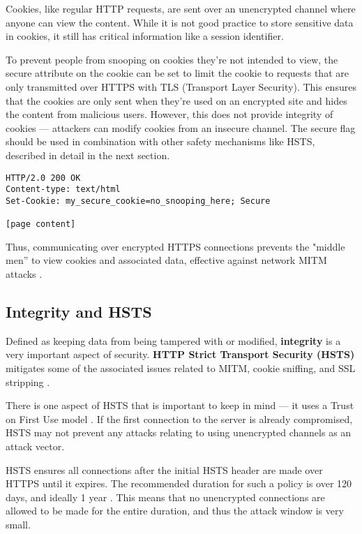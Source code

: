 \documentclass[conference,12pt]{IEEEtran}
\begin{document}
Cookies, like regular HTTP requests, are sent over an unencrypted channel where
anyone can view the content.  While it is not good practice to store sensitive
data in cookies, it still has critical information like a session identifier.

To prevent people from snooping on cookies they’re not intended to view, the
secure attribute on the cookie can be set to limit the cookie to requests that
are only transmitted over HTTPS with TLS (Transport Layer Security).  This
ensures that the cookies are only sent when they’re used on an encrypted site
and hides the content from malicious users.  However, this does not provide
integrity of cookies — attackers can modify cookies from an insecure channel.
The secure flag should be used in combination with other safety mechanisms like
HSTS, described in detail in the next section.

\begin{lstlisting}[caption={An example of server response header to set a secure cookie}]
HTTP/2.0 200 OK
Content-type: text/html
Set-Cookie: my_secure_cookie=no_snooping_here; Secure

[page content]
\end{lstlisting}

Thus, communicating over encrypted HTTPS connections prevents the "middle men”
to view cookies and associated data, effective against network MITM attacks
\cite{b3}.

\subsection{Integrity and HSTS}

Defined as keeping data from being tampered with or modified, \textbf{integrity}
is a very important aspect of security. \textbf{HTTP Strict Transport Security (HSTS)}
mitigates some of the associated issues related to MITM, cookie sniffing, and
SSL stripping \cite{b4}.

There is one aspect of HSTS that is important to keep in mind — it uses a Trust
on First Use model \cite{b5}. If the first connection to the server is already
compromised, HSTS may not prevent any attacks relating to using unencrypted
channels as an attack vector.

HSTS ensures all connections after the initial HSTS header are made over HTTPS
until it expires.  The recommended duration for such a policy is over 120 days,
and ideally 1 year \cite{b6}.  This means that no unencrypted connections are
allowed to be made for the entire duration, and thus the attack window is very
small.
\end{document}
